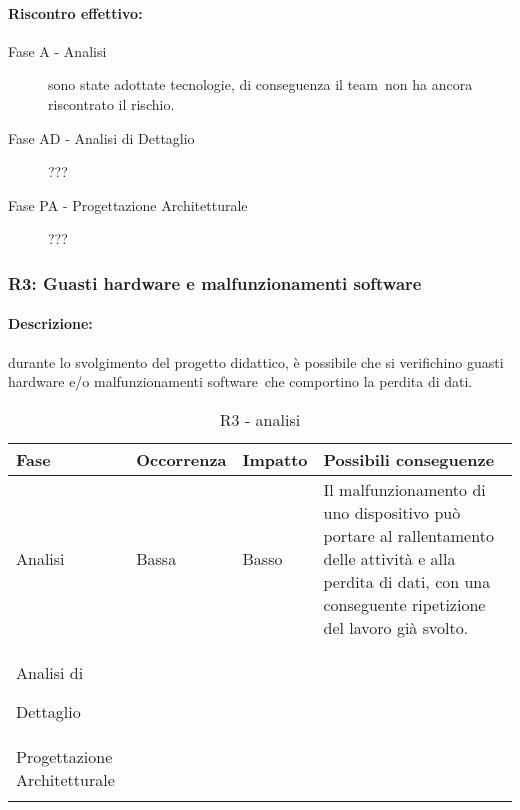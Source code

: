\documentclass[../PianoProgetto.tex]{subfiles}
\begin{document}
	\paragraph*{Riscontro effettivo:} 
		\begin{description}
			\item[Fase A - Analisi] sono state adottate tecnologie, di conseguenza il team\g\ non ha ancora riscontrato il rischio.
			\item[Fase AD - Analisi di Dettaglio] ???
			\item[Fase PA - Progettazione Architetturale] ???
		\end{description}


	\subsubsection{R3: Guasti hardware e malfunzionamenti software}
	
	\paragraph*{Descrizione:} durante lo svolgimento del progetto didattico, è possibile che si verifichino guasti hardware e/o malfunzionamenti software\g\ che comportino la perdita di dati.
	
	
	\begin{table}[h]
		\centering
		\begin{tabularx}{\textwidth}{F O O P}
			\toprule
			\textbf{Fase} & \textbf{Occorrenza} & \textbf{Impatto} & \textbf{Possibili conseguenze}\\
			\midrule
			Analisi & Bassa & Basso & Il malfunzionamento di uno dispositivo può portare al rallentamento delle attività e alla perdita di dati, con una conseguente ripetizione del lavoro già svolto. \\
			\midrule
			Analisi di \par Dettaglio & & & \\
			\midrule
			Progettazione Architetturale & & & \\
			\bottomrule
		\end{tabularx}
		\caption{R3 - analisi}
		\label{tab:R3-analisi}	
	\end{table} 
		
\end{document}
